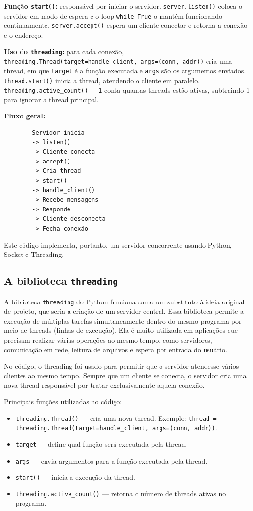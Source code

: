 	\textbf{Função \texttt{start()}:} responsável por iniciar o servidor. \verb|server.listen()| coloca o servidor em modo de espera e o loop \verb|while True| o mantém funcionando continuamente. \verb|server.accept()| espera um cliente conectar e retorna a conexão e o endereço.
	
	\textbf{Uso do \texttt{threading}:} para cada conexão, \verb|threading.Thread(target=handle_client, args=(conn, addr))| cria uma thread, em que \verb|target| é a função executada e \verb|args| são os argumentos enviados. \verb|thread.start()| inicia a thread, atendendo o cliente em paralelo. \verb|threading.active_count() - 1| conta quantas threads estão ativas, subtraindo 1 para ignorar a thread principal.
	
	\textbf{Fluxo geral:}
	\begin{verbatim}
		Servidor inicia
		-> listen()
		-> Cliente conecta
		-> accept()
		-> Cria thread
		-> start()
		-> handle_client()
		-> Recebe mensagens
		-> Responde
		-> Cliente desconecta
		-> Fecha conexão
	\end{verbatim}
	
	Este código implementa, portanto, um servidor concorrente usando Python, Socket e Threading.
	
	\subsection*{A biblioteca \texttt{threading}}
	
	A biblioteca \verb|threading| do Python funciona como um substituto à ideia original de projeto, que seria a criação de um servidor central. Essa biblioteca permite a execução de múltiplas tarefas simultaneamente dentro do mesmo programa por meio de threads (linhas de execução). Ela é muito utilizada em aplicações que precisam realizar várias operações ao mesmo tempo, como servidores, comunicação em rede, leitura de arquivos e espera por entrada do usuário.
	
	No código, o threading foi usado para permitir que o servidor atendesse vários clientes ao mesmo tempo. Sempre que um cliente se conecta, o servidor cria uma nova thread responsável por tratar exclusivamente aquela conexão.
	
	Principais funções utilizadas no código:
	\begin{itemize}
		\item \verb|threading.Thread()| --- cria uma nova thread. Exemplo: \verb|thread = threading.Thread(target=handle_client, args=(conn, addr))|.
		\item \verb|target| --- define qual função será executada pela thread.
		\item \verb|args| --- envia argumentos para a função executada pela thread.
		\item \verb|start()| --- inicia a execução da thread.
		\item \verb|threading.active_count()| --- retorna o número de threads ativas no programa.
	\end{itemize}
	
